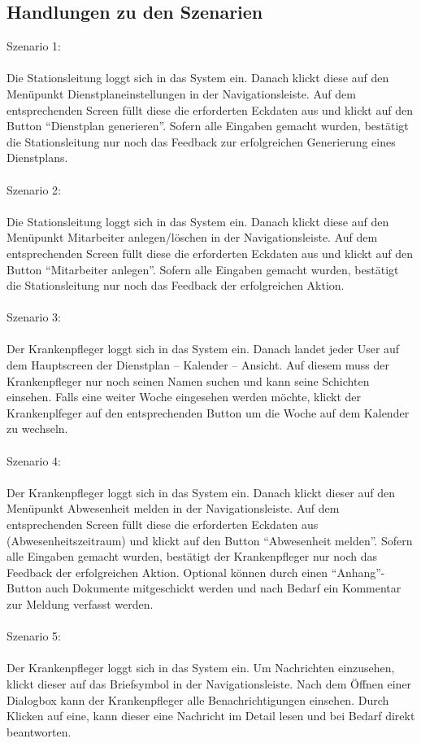 \documentclass[11pt,
paper=a4,
bibtotocnumbered,	  %
liststotocnumbered,  %
DIV=calc,		  %
tablecaptionabove,	  %
headinclude,
]{article}
\begin{document}
\subsection{Handlungen zu den Szenarien}
Szenario 1: \\\\
Die Stationsleitung loggt sich in das System ein. Danach klickt diese auf den Menüpunkt Dienstplaneinstellungen in der Navigationsleiste. Auf dem entsprechenden Screen füllt diese die erforderten Eckdaten aus und klickt auf den Button “Dienstplan generieren”. Sofern alle Eingaben gemacht wurden, bestätigt die Stationsleitung nur noch das Feedback zur erfolgreichen Generierung eines Dienstplans.\\\\
Szenario 2: \\\\
Die Stationsleitung loggt sich in das System ein. Danach klickt diese auf den Menüpunkt Mitarbeiter anlegen/löschen in der Navigationsleiste. Auf dem entsprechenden Screen füllt diese die erforderten Eckdaten aus und klickt auf den Button “Mitarbeiter anlegen”. Sofern alle Eingaben gemacht wurden, bestätigt die Stationsleitung nur noch das Feedback der erfolgreichen Aktion.\\\\
Szenario 3:\\\\
Der Krankenpfleger loggt sich in das System ein. Danach landet jeder User auf dem Hauptscreen der Dienstplan – Kalender – Ansicht. Auf diesem muss der Krankenpfleger nur noch seinen Namen suchen und kann seine Schichten einsehen. Falls eine weiter Woche eingesehen werden möchte, klickt der Krankenplfeger auf den entsprechenden Button um die Woche auf dem Kalender zu wechseln.\\\\
Szenario 4:\\\\
Der Krankenpfleger loggt sich in das System ein. Danach klickt dieser auf den Menüpunkt Abwesenheit melden in der Navigationsleiste. Auf dem entsprechenden Screen füllt diese die erforderten Eckdaten aus (Abwesenheitszeitraum) und klickt auf den Button “Abwesenheit melden”. Sofern alle Eingaben gemacht wurden, bestätigt der Krankenpfleger nur noch das Feedback der erfolgreichen Aktion. Optional können durch einen “Anhang”- Button auch Dokumente mitgeschickt werden und nach Bedarf ein Kommentar zur Meldung verfasst werden. \\\\
Szenario 5:\\\\
Der Krankenpfleger loggt sich in das System ein. Um Nachrichten einzusehen, klickt dieser auf das Briefsymbol in der Navigationsleiste. Nach dem Öffnen einer Dialogbox kann der Krankenpfleger alle Benachrichtigungen einsehen. Durch Klicken auf eine, kann dieser eine Nachricht im Detail lesen und bei Bedarf direkt beantworten.
\end{document}
